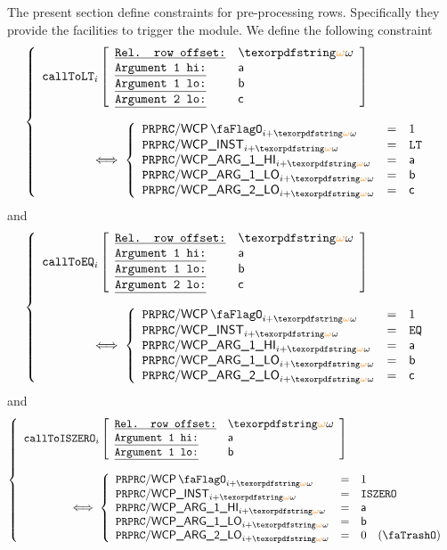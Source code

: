 The present section define constraints for pre-processing rows.
Specifically they provide the facilities to trigger the \wcpMod{} module.
We define the following constraint
\[
	\left\{ \begin{array}{l}
		\callToLt
		{i}{\relof}
		{\col{a}}{\col{b}}
		{\col{c}}
		\vspace{4mm} \\
		\qquad \qquad \iff
		\left\{ \begin{array}{lcl}
		       \ppWcpFlag       _{i + \relof} & = & 1 \\ 
		       \ppWcpInst       _{i + \relof} & = & \inst{LT} \\ 
		       \ppWcpArgOneHi   _{i + \relof} & = & \col{a} \\
		       \ppWcpArgOneLo   _{i + \relof} & = & \col{b} \\
		       \ppWcpArgTwoLo   _{i + \relof} & = & \col{c} \\
		\end{array} \right.
	\end{array} \right.
\]
and
\[
	\left\{ \begin{array}{l}
		\callToEq
		{i}{\relof}
		{\col{a}}{\col{b}}
		{\col{c}}
		\vspace{4mm} \\
		\qquad \qquad \iff
		\left\{ \begin{array}{lcl}
		       \ppWcpFlag       _{i + \relof} & = & 1 \\ 
		       \ppWcpInst       _{i + \relof} & = & \inst{EQ} \\ 
		       \ppWcpArgOneHi   _{i + \relof} & = & \col{a} \\
		       \ppWcpArgOneLo   _{i + \relof} & = & \col{b} \\
		       \ppWcpArgTwoLo   _{i + \relof} & = & \col{c} \\
		\end{array} \right.
	\end{array} \right.
\]
and
\[
	\left\{ \begin{array}{l}
		\callToIszero
		{i}{\relof}
		{\col{a}}{\col{b}}
		\vspace{4mm} \\
		\qquad \qquad \iff
		\left\{ \begin{array}{lcl}
		       \ppWcpFlag       _{i + \relof} & = & 1 \\ 
		       \ppWcpInst       _{i + \relof} & = & \inst{ISZERO} \\ 
		       \ppWcpArgOneHi   _{i + \relof} & = & \col{a} \\
		       \ppWcpArgOneLo   _{i + \relof} & = & \col{b} \\
		       \ppWcpArgTwoLo   _{i + \relof} & = & 0 \quad (\trash) \\
		\end{array} \right.
	\end{array} \right.
\]

